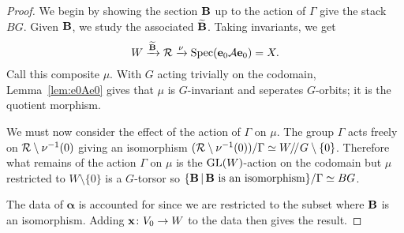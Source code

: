 \documentclass{amsart}
\newcommand{\balpha}{\boldsymbol{\alpha}}
\theoremstyle{definition}
\begin{document}
\begin{proof}
We begin by showing the section $\mathbf{B}$ up to the action of $\Gamma$ give the stack $BG$.
Given $\mathbf{B}$, we study the associated $\widetilde{\mathbf{B}}$.
Taking invariants, we get 
$$W \xrightarrow{\widetilde{\mathbf{B}}} \mathcal{R} \xrightarrow{\nu} \operatorname{Spec}(\mathbf{e}_0 \mathcal{A} \mathbf{e}_0) = X.$$
Call this composite $\mu$.
With $G$ acting trivially on the codomain, Lemma~\ref{lem:e0Ae0} gives that $\mu$ is $G$-invariant and seperates $G$-orbits; it is the quotient morphism.

We must now consider the effect of the action of $\Gamma$ on $\mu$.
The group $\Gamma$ acts freely on $\mathcal{R}\setminus \nu^{-1}(0)$ giving an isomorphism $(\mathcal{R}\setminus \nu^{-1}(0)) / \Gamma \simeq W / \! /_{} G \setminus\{0\}$.
Therefore what remains of the action $\Gamma$ on $\mu$ is the $\operatorname{GL}(W)$-action on the codomain but $\mu$ restricted to $W\setminus \{0\}$ is a $G$-torsor so $\{\mathbf{B}\, | \, \mathbf{B} \text{ is an isomorphism}\}/\Gamma \simeq BG$.

The data of $\balpha$ is accounted for since we are restricted to the subset where $\mathbf{B}$ is an isomorphism.
Adding $\mathbf{x} \colon V_0 \rightarrow W$ to the data then gives the result.
\end{proof}

\end{document}
